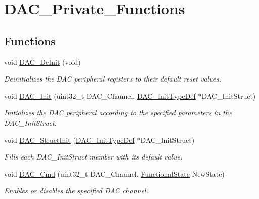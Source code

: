 \hypertarget{group___d_a_c___private___functions}{}\section{D\+A\+C\+\_\+\+Private\+\_\+\+Functions}
\label{group___d_a_c___private___functions}
\subsection*{Functions}
\begin{DoxyCompactItemize}
\item 
void \mbox{\hyperlink{group___d_a_c___private___functions_ga1fae225204e1e049d6795319e99ba8bc}{D\+A\+C\+\_\+\+De\+Init}} (void)
\begin{DoxyCompactList}\small\item\em Deinitializes the D\+AC peripheral registers to their default reset values. \end{DoxyCompactList}\item 
void \mbox{\hyperlink{group___d_a_c___private___functions_ga7c59850468ed4bf0659663fe495441da}{D\+A\+C\+\_\+\+Init}} (uint32\+\_\+t D\+A\+C\+\_\+\+Channel, \mbox{\hyperlink{struct_d_a_c___init_type_def}{D\+A\+C\+\_\+\+Init\+Type\+Def}} $\ast$D\+A\+C\+\_\+\+Init\+Struct)
\begin{DoxyCompactList}\small\item\em Initializes the D\+AC peripheral according to the specified parameters in the D\+A\+C\+\_\+\+Init\+Struct. \end{DoxyCompactList}\item 
void \mbox{\hyperlink{group___d_a_c___private___functions_gadfc270974d54cb5fa5f92556015c4046}{D\+A\+C\+\_\+\+Struct\+Init}} (\mbox{\hyperlink{struct_d_a_c___init_type_def}{D\+A\+C\+\_\+\+Init\+Type\+Def}} $\ast$D\+A\+C\+\_\+\+Init\+Struct)
\begin{DoxyCompactList}\small\item\em Fills each D\+A\+C\+\_\+\+Init\+Struct member with its default value. \end{DoxyCompactList}\item 
void \mbox{\hyperlink{group___d_a_c___private___functions_ga323e61530d7fa9396c3bce9edb61f733}{D\+A\+C\+\_\+\+Cmd}} (uint32\+\_\+t D\+A\+C\+\_\+\+Channel, \mbox{\hyperlink{group___exported__types_gac9a7e9a35d2513ec15c3b537aaa4fba1}{Functional\+State}} New\+State)
\begin{DoxyCompactList}\small\item\em Enables or disables the specified D\+AC channel. \end{DoxyCompactList}\item 

\end{DoxyCompactItemize}
